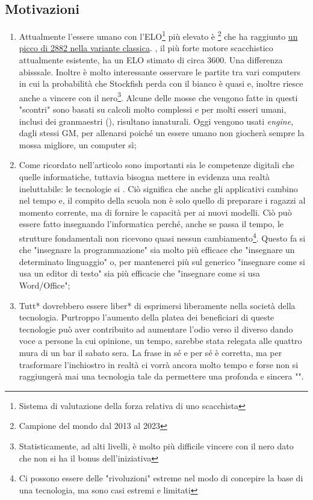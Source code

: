\subsection{Motivazioni}
\begin{enumerate}
    \item Attualmente l'essere umano con l'ELO\footnote{Sistema di valutazione della forza relativa di uno scacchista} più elevato è \textbf{}\footnote{Campione del mondo dal 2013 al 2023} che ha raggiunto \href{https://www.chess.com/it/article/view/magnus-carlsen-campione-mondo-scacchi-retrospettiva#elo}{un picco di 2882 nella variante classica}. \textbf{}, il più forte motore scacchistico attualmente esistente, ha un ELO stimato di circa 3600. Una differenza abisssale. Inoltre è molto interessante osservare le partite tra vari computers in cui la probabilità che Stockfish perda con il bianco è quasi e, inoltre riesce anche a vincere con il nero\footnote{Statisticamente, ad alti livelli, è molto più difficile vincere con il nero dato che non si ha il bonus dell'iniziativa}. Alcune delle mosse che vengono fatte in questi "scontri" sono basati su calcoli molto complessi e per molti esseri umani, inclusi dei granmaestri (\textbf{}), risultano innaturali. Oggi vengono usati \textit{engine}, dagli stessi GM, per allenarsi poiché un essere umano non giocherà sempre la mossa migliore, un computer sì;
    \item Come ricordato nell'articolo sono importanti sia le competenze digitali che quelle informatiche, tuttavia bisogna mettere in evidenza una realtà ineluttabile: le tecnologie si \textbf{}. Ciò significa che anche gli applicativi cambino nel tempo e, il compito della scuola non è solo quello di preparare i ragazzi al momento corrente, ma di fornire le capacità per \textbf{} ai nuovi modelli. Ciò può essere fatto insegnando l'informatica perché, anche se passa il tempo, le strutture fondamentali non ricevono quasi nessun cambiamento\footnote{Ci possono essere delle "rivoluzioni" estreme nel modo di concepire la base di una tecnologia, ma sono casi estremi e limitati}. Questo fa si che "insegnare la programmazione" sia molto più efficace che "insegnare un determinato linguaggio" o, per mantenerci più sul generico "insegnare come si usa un editor di testo" sia più efficacie che "insegnare come si usa Word/Office";
    \item Tutt*  dovrebbero essere liber* di esprimersi liberamente nella società della tecnologia. Purtroppo l'aumento della platea dei beneficiari di queste tecnologie può aver contribuito ad aumentare l'odio verso il diverso dando voce a persone la cui opinione, un tempo, sarebbe stata relegata alle quattro mura di un bar il sabato sera. La frase in sé e per sé è corretta, ma per trasformare l'inchiostro in realtà ci vorrà ancora molto tempo e forse non si raggiungerà mai una tecnologia tale da permettere una profonda e sincera "".
\end{enumerate}

